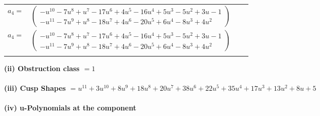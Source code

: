 \documentclass[1p]{elsarticle_modified}
\theoremstyle{definition}
\begin{document}
\begin{tabular}{m{7pt} m{180pt} m{7pt} m{180pt} }
\flushright $a_{4}=$&$\begin{pmatrix}- u^{10}-7 u^8+u^7-17 u^6+4 u^5-16 u^4+5 u^3-5 u^2+3 u-1\\- u^{11}-7 u^9+u^8-18 u^7+4 u^6-20 u^5+6 u^4-8 u^3+4 u^2\end{pmatrix}$\\ \flushright $a_{4}=$&$\begin{pmatrix}- u^{10}-7 u^8+u^7-17 u^6+4 u^5-16 u^4+5 u^3-5 u^2+3 u-1\\- u^{11}-7 u^9+u^8-18 u^7+4 u^6-20 u^5+6 u^4-8 u^3+4 u^2\end{pmatrix}$\\&\end{tabular}
\flushleft \textbf{(ii) Obstruction class $= 1$}\\~\\
\flushleft \textbf{(iii) Cusp Shapes $= u^{11}+3 u^{10}+8 u^9+18 u^8+20 u^7+38 u^6+22 u^5+35 u^4+17 u^3+13 u^2+8 u+5$}\\~\\
\newpage\renewcommand{\arraystretch}{1}
\flushleft \textbf{(iv) u-Polynomials at the component}\newline \\
\end{document}
